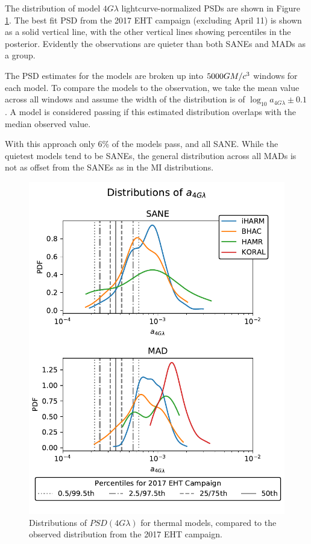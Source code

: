 
The distribution of model $4G\lambda$ lightcurve-normalized PSDs are shown in Figure \ref{fig:cmp_VLBI_var}.  The best fit PSD from the 2017 EHT campaign (excluding April 11) is shown as a solid vertical line, with the other vertical lines showing percentiles in the posterior.  Evidently the observations are quieter than both SANEs and MADs as a group.

The PSD estimates for the models are broken up into $5000GM/c^3$ windows for each model. To compare the models to the observation, we take the mean value across all windows and assume the width of the distribution is of $\log_{10} a_{4G\lambda} \pm 0.1$. A model is considered passing if this estimated distribution overlaps with the median observed value.  

With this approach only 6\% of the models pass, and all SANE. While the quietest models tend to be SANEs, the general distribution across all MADs is not as offset from the SANEs as in the MI distributions. 

\begin{figure}
  \centering
    \includegraphics[width=\columnwidth]{./figures/va_dist.pdf}
  \caption{Distributions of $PSD(4G\lambda)$ for thermal models, compared to the observed distribution from the 2017 EHT campaign.
  }
  \label{fig:cmp_VLBI_var}
\end{figure}

